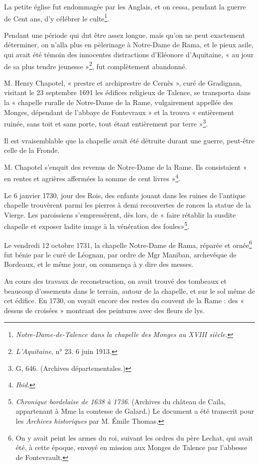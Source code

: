 \documentclass[a4paper,11pt]{book}
\begin{document}
La petite église fut endommagée par les Anglais, et on cessa, pendant la guerre de Cent ans, d'y célébrer le culte\footnote{\textit{Notre-Dame-de-Talence dans la chapelle des Monges au XVIII\ieme{} siècle}.}.

Pendant une période qui dut être assez longue, mais qu'on ne peut exactement déterminer, on n'alla plus en pèlerinage à Notre-Dame de Rama, et le pieux asile, qui avait été témoin des innocentes distractions d'Eléonore d'Aquitaine, « au jour de sa plus tendre jeunesse »\footnote{\textit{L'Aquitaine}, n° 23. 6 juin 1913.}, fut complètement abandonné.

M. Henry Chapotel, « prestre et archiprestre de Cernès », curé de Gradignan, visitant le 23 septembre 1691 les édifices religieux de Talence, se transporta dans la « chapelle ruralle de Notre-Dame de la Rame, vulgairement appellée des Monges, dépendant de l'abbaye de Fontevraux » et la trouva « entièrement ruinée, sans toit et sans porte, tout étant entièrement par terre »\footnote{G, 646. (Archives départementales.)}.

Il est vraisemblable que la chapelle avait été détruite durant une guerre, peut-être celle de la Fronde.

M. Chapotel s'enquit des revenus de Notre-Dame de la Rame. Ils consistaient « en rentes et agrières affermées la somme de cent livres »\footnote{\textit{Ibid}.}.

Le 6 janvier 1730, jour des Rois, des enfants jouant dans les ruines de l'antique chapelle trouvèrent parmi les pierres à demi recouvertes de ronces la statue de la Vierge. Les paroissiens s'empressèrent, dès lors, de « faire rétablir la susdite chapelle et exposer ladite image à la vénération des foules»\footnote{\textit{Chronique bordelaise de 1638 à 1736}. (Archives du château de Caila, appartenant à Mme la comtesse de Galard.) Le document a été transcrit pour les \textit{Archives historiques} par M. Émile Thomas.}.

Le vendredi 12 octobre 1731, la chapelle Notre-Dame de Rama, réparée et ornée\footnote{On y avait peint les armes du roi, suivant les ordres du père Lechat, qui avait été, à cette époque, envoyé en mission aux Monges de Talence par l'abbesse de Fontevrault.} fut bénie par le curé de Léognan, par ordre de Mgr Maniban, archevêque de Bordeaux, et le même jour, on commença à y dire des messes.

Au cours des travaux de reconstruction, on avait trouvé des tombeaux et beaucoup d'ossements dans le terrain, autour de la chapelle, et sur le sol même de cet édifice. En 1730, on voyait encore des restes du couvent de la Rame : des « dessus de croisées » montrant des peintures avec des fleurs de lys.
\end{document}
